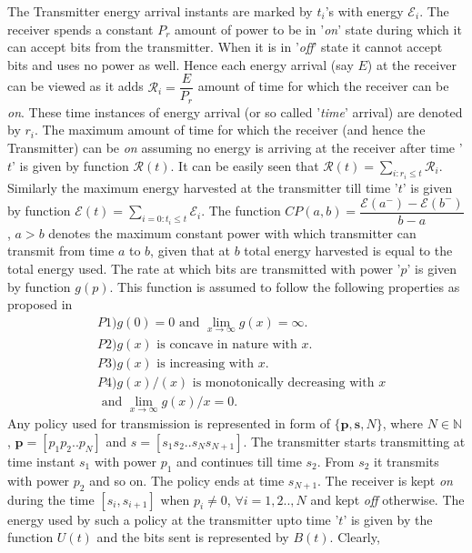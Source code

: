 The Transmitter energy arrival instants are marked by $t_i$'s with energy $\mathcal{E}_i$. %
 The receiver spends a constant $P_{r}$ amount of power to be in '\textit{on}' state during which it can accept bits from the transmitter. When it is in '\textit{off}' state it cannot accept bits and uses no power as well. Hence each energy arrival (say $E$) at the receiver can be viewed as it adds $\mathcal{R}_i=\dfrac{E}{P_{r}}$ amount of time for which the receiver can be \textit{on}. These time instances of energy arrival (or so called '\textit{time}' arrival) are denoted by $r_i$. The maximum amount of time for which the receiver (and hence the Transmitter) can be \textit{on} assuming no energy is arriving at the receiver after time '$t$' is given by function $\mathcal{R}(t)$. It can be easily seen that $\mathcal{R}(t)=\underset{i:r_i\le t}{\sum}\mathcal{R}_i$. Similarly the maximum energy harvested at the transmitter till time '$t$' is given by function $\mathcal{E}(t)=\underset{i=0:t_i\le t}{\sum}\mathcal{E}_i$. The function $CP(a,b)=\dfrac{\mathcal{E}(a^- )-\mathcal{E}(b^- )}{b-a}$ , $a>b$ denotes the maximum constant power with which transmitter can transmit from time $a$ to $b$, given that at $b$ total energy harvested is equal to the total energy used. The rate at which bits are transmitted with power '$p$' is given by function $g(p)$. This function is assumed to follow the following properties as proposed in \cite{Yang} 
\begin{align}
&P1) g(0)=0\text{ and }\lim_{x\rightarrow \infty} g(x)= \infty.
\\
&P2) g(x)\text{ is concave in nature with } x.
\\
&P3) g(x)\text{ is increasing with } x.
\\ 
&P4) g(x)/(x) \text{ is monotonically decreasing with } x
\\
&\text{ and } \lim_{x\rightarrow \infty} g(x)/x= 0.
\end{align}
Any policy used for transmission is represented in form of $\{\textbf{p},\textbf{s},N\}$, where $N\in \mathbb{N}$, $\textbf{p}=[p_1 p_2 .. p_N]$ and $s=[s_1 s_2 .. s_N s_{N+1}]$. The transmitter starts transmitting at time instant $s_1$ with power $p_1$ and continues till time $s_2$. From $s_2$ it transmits with power $p_2$ and so on. The policy ends at time $s_{N+1}$. The receiver is kept \textit{on} during the time $[s_i,s_{i+1}]$ when $p_i\ne 0$, $\forall i=1,2..,N$ and kept \textit{off} otherwise. The energy used by such a policy at the transmitter upto time '$t$' is given by the function $U(t)$ and the bits sent is represented by $B(t)$. Clearly,
